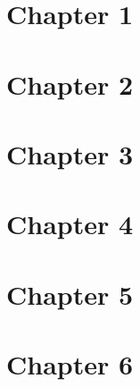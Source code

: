 \documentclass{article}
\begin{document}
\section{Chapter 1}

\section{Chapter 2}

\section{Chapter 3}

\section{Chapter 4}

\section{Chapter 5}

\section{Chapter 6}

\end{document}
